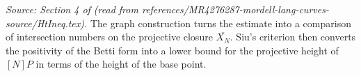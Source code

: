 \begin{proposition}
  \label{prop:aux_ht_ineq}
  \textit{Source: Section 4 of \cite{MR4276287-mordell-lang-curves} (read from references/MR4276287-mordell-lang-curves-source/HtIneq.tex).}
  The graph construction turns the estimate into a comparison of intersection
  numbers on the projective closure \(\overline{X_N}\). Siu's criterion then
  converts the positivity of the Betti form into a lower bound for the
  projective height of \([N]P\) in terms of the height of the base point.
\end{proposition}


